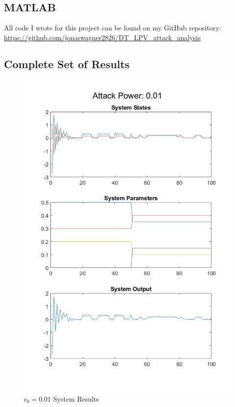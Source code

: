 \documentclass[]{article}
\begin{document}





\onecolumn
\newpage
\appendix
\subsection{MATLAB}\label{apx:MATLAB}
All code I wrote for this project can be found on my GitHub repository:\\
\href{https://github.com/jonaswagner2826/DT_LPV_attack_analysis}{https://github.com/jonaswagner2826/DT\_LPV\_attack\_analysis}\\

\newpage

\newpage

\newpage


\subsection{Complete Set of Results} \label{apx:figs}

\begin{figure}
	\centering
	\includegraphics[width=0.7\linewidth]{../../fig/SystemResponse_attack_0_01}
	\caption{$v_0 = 0.01$ System Results}
	\label{fig:systemresponseattack001}
\end{figure}
\end{document}
